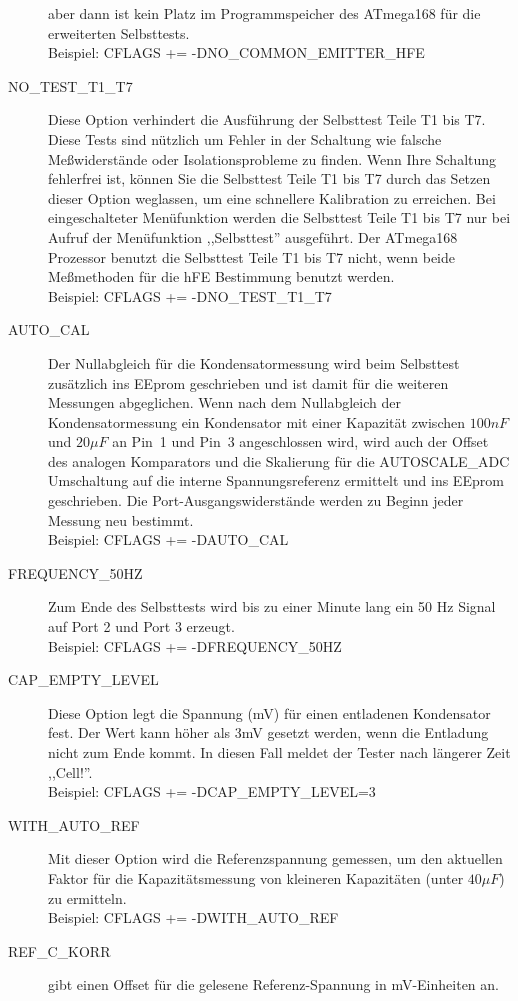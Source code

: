 \begin{description}
aber dann ist kein Platz im Programmspeicher des ATmega168 für die erweiterten Selbsttests.\\
Beispiel: CFLAGS += -DNO\_COMMON\_EMITTER\_HFE
  \item[NO\_TEST\_T1\_T7] Diese Option verhindert die Ausführung der Selbsttest Teile T1 bis T7.
Diese Tests sind nützlich um Fehler in der Schaltung wie falsche Meßwiderstände oder Isolationsprobleme zu finden.
Wenn Ihre Schaltung fehlerfrei ist, können Sie die Selbsttest Teile T1 bis T7 durch das Setzen dieser Option weglassen, um eine
schnellere Kalibration zu erreichen.
Bei eingeschalteter Menüfunktion werden die Selbsttest Teile T1 bis T7 nur bei Aufruf der Menüfunktion ,,Selbsttest'' ausgeführt.
Der ATmega168 Prozessor benutzt die Selbsttest Teile T1 bis T7 nicht, wenn beide Meßmethoden für die hFE Bestimmung benutzt werden.\\
Beispiel: CFLAGS += -DNO\_TEST\_T1\_T7
  \item[AUTO\_CAL] Der Nullabgleich für die Kondensatormessung wird beim
Selbsttest zusätzlich ins EEprom geschrieben und ist damit für die weiteren Messungen abgeglichen.
Wenn nach dem Nullabgleich der Kondensatormessung ein Kondensator mit einer Kapazität zwischen \(100 nF\) und \(20 \mu F\) an Pin~1 und Pin~3 
angeschlossen wird, wird auch der Offset des analogen Komparators und die Skalierung für die AUTOSCALE\_ADC
Umschaltung auf die interne Spannungsreferenz ermittelt und ins EEprom geschrieben.
Die Port-Ausgangswiderstände werden zu Beginn jeder Messung neu bestimmt. \\
Beispiel: CFLAGS += -DAUTO\_CAL
  \item[FREQUENCY\_50HZ] Zum Ende des Selbsttests wird bis zu einer Minute lang ein 50 Hz Signal auf Port 2 und Port 3 erzeugt.\\
Beispiel: CFLAGS += -DFREQUENCY\_50HZ
  \item[CAP\_EMPTY\_LEVEL] Diese Option legt die Spannung (mV) für einen entladenen Kondensator fest.
Der Wert kann höher als 3mV gesetzt werden, wenn die Entladung nicht zum Ende kommt. In diesen Fall meldet der Tester nach längerer Zeit ,,Cell!''.\\
Beispiel: CFLAGS += -DCAP\_EMPTY\_LEVEL=3
  \item[WITH\_AUTO\_REF] Mit dieser Option wird die Referenzspannung gemessen, um den aktuellen Faktor für die Kapazitätsmessung 
von kleineren Kapazitäten (unter \(40\mu F\)) zu ermitteln.\\
Beispiel: CFLAGS += -DWITH\_AUTO\_REF
  \item[REF\_C\_KORR] gibt einen Offset für die gelesene Referenz-Spannung in mV-Einheiten an.

\end{description}
